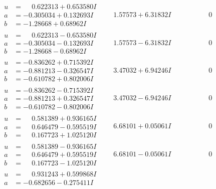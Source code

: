 \documentclass[1p]{elsarticle_modified}
\theoremstyle{definition}
\begin{document}
$$\begin{array}{c|c|c}
 \hline 
\begin{aligned}
u &= \phantom{-}0.622313 + 0.653580 I \\
a &= -0.305034 + 0.132693 I \\
b &= -1.28668 + 0.68962 I\end{aligned}
 & \phantom{-}1.57573 + 6.31832 I & \phantom{-0.000000 } 0 \\ \hline\begin{aligned}
u &= \phantom{-}0.622313 - 0.653580 I \\
a &= -0.305034 - 0.132693 I \\
b &= -1.28668 - 0.68962 I\end{aligned}
 & \phantom{-}1.57573 - 6.31832 I & \phantom{-0.000000 } 0 \\ \hline\begin{aligned}
u &= -0.836262 + 0.715392 I \\
a &= -0.881213 - 0.326547 I \\
b &= -0.610782 + 0.802006 I\end{aligned}
 & \phantom{-}3.47032 + 6.94246 I & \phantom{-0.000000 } 0 \\ \hline\begin{aligned}
u &= -0.836262 - 0.715392 I \\
a &= -0.881213 + 0.326547 I \\
b &= -0.610782 - 0.802006 I\end{aligned}
 & \phantom{-}3.47032 - 6.94246 I & \phantom{-0.000000 } 0 \\ \hline\begin{aligned}
u &= \phantom{-}0.581389 + 0.936165 I \\
a &= \phantom{-}0.646479 - 0.595519 I \\
b &= \phantom{-}0.167723 + 1.025120 I\end{aligned}
 & \phantom{-}6.68101 + 0.05061 I & \phantom{-0.000000 } 0 \\ \hline\begin{aligned}
u &= \phantom{-}0.581389 - 0.936165 I \\
a &= \phantom{-}0.646479 + 0.595519 I \\
b &= \phantom{-}0.167723 - 1.025120 I\end{aligned}
 & \phantom{-}6.68101 - 0.05061 I & \phantom{-0.000000 } 0 \\ \hline\begin{aligned}
u &= \phantom{-}0.931243 + 0.599868 I \\
a &= -0.682656 - 0.275411 I \\

\end{aligned}
\end{array}$$
\end{document}
